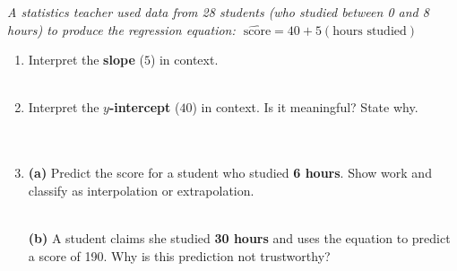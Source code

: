 \documentclass[10pt]{article}
\begin{document}
\namedateperiod

\vspace{0.18in}

\begin{tcolorbox}[colback=sky, colframe=navy, boxrule=0.9pt, arc=2mm,
    left=4mm, right=4mm, top=2.5mm, bottom=2.5mm]
\small\textit{A statistics teacher used data from 28 students (who studied between 0 and 8
hours) to produce the regression equation:
$\;\widehat{\text{score}} = 40 + 5(\text{hours studied})$}
\end{tcolorbox}

\vspace{0.16in}

\begin{enumerate}[leftmargin=1.6em, itemsep=0.16in]

  \item Interpret the \textbf{slope} ($5$) in context.\\[8pt]
        \writeline\\[3pt]\writeline

  \item Interpret the \textbf{$y$-intercept} ($40$) in context. Is it meaningful? State why.\\[8pt]
        \writeline\\[3pt]\writeline\\[3pt]\writeline

  \item \textbf{(a)} Predict the score for a student who studied \textbf{6 hours}. Show work
        and classify as interpolation or extrapolation.\\[8pt]
        \writeline\\[3pt]\writeline

        \textbf{(b)} A student claims she studied \textbf{30 hours} and uses the equation to
        predict a score of 190. Why is this prediction not trustworthy?\\[8pt]
        \writeline\\[3pt]\writeline

\end{enumerate}

\vspace{0.14in}
\end{document}
